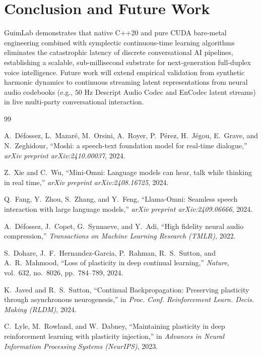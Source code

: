 \documentclass[10pt,twocolumn,letterpaper]{article}
\begin{document}
\section{Conclusion and Future Work}
GuimLab demonstrates that native C++20 and pure CUDA bare-metal engineering combined with symplectic continuous-time learning algorithms eliminates the catastrophic latency of discrete conversational AI pipelines, establishing a scalable, sub-millisecond substrate for next-generation full-duplex voice intelligence. Future work will extend empirical validation from synthetic harmonic dynamics to continuous streaming latent representations from neural audio codebooks (e.g., $50\text{ Hz}$ Descript Audio Codec and EnCodec latent streams) in live multi-party conversational interaction.

\begin{thebibliography}{99}

A.~D{\'e}fossez, L.~Mazar{\'e}, M.~Orsini, A.~Royer, P.~P{\'e}rez, H.~J{\'e}gou, E.~Grave, and N.~Zeghidour,
``Moshi: a speech-text foundation model for real-time dialogue,''
\emph{arXiv preprint arXiv:2410.00037}, 2024.

Z.~Xie and C.~Wu,
``Mini-Omni: Language models can hear, talk while thinking in real time,''
\emph{arXiv preprint arXiv:2408.16725}, 2024.

Q.~Fang, Y.~Zhou, S.~Zhang, and Y.~Feng,
``Llama-Omni: Seamless speech interaction with large language models,''
\emph{arXiv preprint arXiv:2409.06666}, 2024.

A.~D{\'e}fossez, J.~Copet, G.~Synnaeve, and Y.~Adi,
``High fidelity neural audio compression,''
\emph{Transactions on Machine Learning Research (TMLR)}, 2022.

S.~Dohare, J.~F.~Hernandez-Garcia, P.~Rahman, R.~S.~Sutton, and A.~R.~Mahmood,
``Loss of plasticity in deep continual learning,''
\emph{Nature}, vol.~632, no.~8026, pp.~784--789, 2024.

K.~Javed and R.~S.~Sutton,
``Continual Backpropagation: Preserving plasticity through asynchronous neurogenesis,''
in \emph{Proc. Conf. Reinforcement Learn. Decis. Making (RLDM)}, 2024.

C.~Lyle, M.~Rowland, and W.~Dabney,
``Maintaining plasticity in deep reinforcement learning with plasticity injection,''
in \emph{Advances in Neural Information Processing Systems (NeurIPS)}, 2023.


\end{thebibliography}
\end{document}
